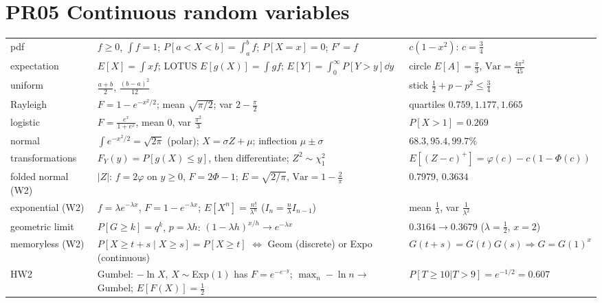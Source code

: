 \documentclass[9pt]{article}
\begin{document}
\section*{PR05 Continuous random variables}
\begin{tabular}{@{}p{2.9cm}p{8.4cm}p{6.1cm}@{}}
\toprule
pdf & $f\ge0$, $\int f=1$; $P[a<X<b]=\int_a^bf$; $P[X=x]=0$; $F'=f$ & $c(1-x^2)$: $c=\tfrac34$\\
expectation & $E[X]=\int xf$; LOTUS $E[g(X)]=\int gf$; $E[Y]=\int_0^\infty P[Y>y]\dd y$ & circle $E[A]=\tfrac\pi3$, $\mathrm{Var}=\tfrac{4\pi^2}{45}$\\
uniform & $\tfrac{a+b}2$, $\tfrac{(b-a)^2}{12}$ & stick $\tfrac12+p-p^2\le\tfrac34$\\
Rayleigh & $F=1-e^{-x^2/2}$; mean $\sqrt{\pi/2}$; var $2-\tfrac\pi2$ & quartiles $0.759,1.177,1.665$\\
logistic & $F=\tfrac{e^x}{1+e^x}$, mean $0$, var $\tfrac{\pi^2}3$ & $P[X>1]=0.269$\\
normal & $\int e^{-x^2/2}=\sqrt{2\pi}$ (polar); $X=\sigma Z+\mu$; inflection $\mu\pm\sigma$ & $68.3,95.4,99.7\%$\\
transformations & $F_Y(y)=P[g(X)\le y]$, then differentiate; $Z^2\sim\chi^2_1$ & $E[(Z-c)^+]=\varphi(c)-c(1-\Phi(c))$\\
folded normal (W2) & $|Z|$: $f=2\varphi$ on $y\ge0$, $F=2\Phi-1$; $E=\sqrt{2/\pi}$, $\mathrm{Var}=1-\tfrac2\pi$ & $0.7979$, $0.3634$\\
exponential (W2) & $f=\lambda e^{-\lambda x}$, $F=1-e^{-\lambda x}$; $E[X^n]=\tfrac{n!}{\lambda^n}$ ($I_n=\tfrac n\lambda I_{n-1}$) & mean $\tfrac1\lambda$, var $\tfrac1{\lambda^2}$\\
geometric limit & $P[G\ge k]=q^k$, $p=\lambda h$: $(1-\lambda h)^{x/h}\to e^{-\lambda x}$ & $0.3164\to0.3679$ ($\lambda{=}\tfrac12$, $x{=}2$)\\
memoryless (W2) & $P[X\ge t+s\mid X\ge s]=P[X\ge t]$ $\iff$ Geom (discrete) or Expo (continuous) & $G(t+s)=G(t)G(s)\Rightarrow G=G(1)^x$\\
HW2 & Gumbel: $-\ln X$, $X{\sim}$Exp$(1)$ has $F=e^{-e^{-y}}$; $\max_n-\ln n\to$ Gumbel; $E[F(X)]=\tfrac12$ & $P[T{\ge}10|T{>}9]=e^{-1/2}=0.607$\\
\bottomrule
\end{tabular}
\end{document}
